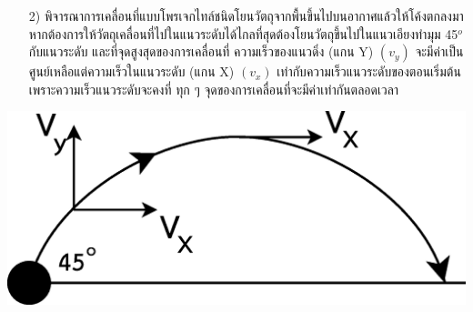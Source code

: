 \begin{minipage}{.6\textwidth}
	\begin{itemize}[leftmargin=*]
		\item[2)] พิจารณาการเคลื่อนที่แบบโพรเจกไทล์ชนิดโยนวัตถุจากพื้นขึ้นไปบนอากาศแล้วให้โค้งตกลงมา หากต้องการให้วัตถุเคลื่อนที่ไปในแนวระดับได้ไกลที่สุดต้องโยนวัตถุขึ้นไปในแนวเอียงทำมุม  45$^o$  กับแนวระดับ     และที่จุดสูงสุดของการเคลื่อนที่    ความเร็วของแนวดิ่ง (แกน Y) $(v_y)$ จะมีค่าเป็นศูนย์เหลือแต่ความเร็วในแนวระดับ (แกน X) $(v_x)$   เท่ากับความเร็วแนวระดับของตอนเริ่มต้น     เพราะความเร็วแนวระดับจะคงที่   ทุก ๆ จุดของการเคลื่อนที่จะมีค่าเท่ากันตลอดเวลา
	\end{itemize}
\end{minipage}
\hfill
\begin{adjustbox}{valign=c} 
	\begin{minipage}[t]{.35\linewidth}
		\includegraphics[width=\linewidth]{content-9-2.eps}
	\end{minipage}
\end{adjustbox}

